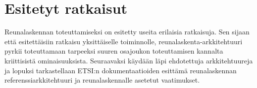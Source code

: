 \documentclass[finnish]{tktltiki2}
\theoremstyle{definition}
\theoremstyle{remark}
\begin{document}






\section{Esitetyt ratkaisut} \label{ratkaisut}
Reunalaskennan toteuttamiseksi on esitetty useita erilaisia ratkaisuja.
Sen sijaan että esitettäisiin ratkaisu yksittäiselle toiminnolle, reunalaskenta-arkkitehtuuri pyrkii toteuttamaan tarpeeksi suuren osajoukon toteuttamisen kannalta kriittisistä ominaisuuksista.
Seuraavaksi käydään läpi ehdotettuja arkkitehtuureja ja lopuksi tarkastellaan ETSI:n
dokumentaatioiden esittämä reunalaskennan referenssiarkkitehtuuri ja
reunalaskennalle asetetut vaatimukset.







 















\lastpage



% 
\end{document}
